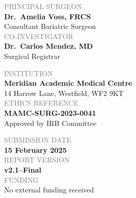\documentclass[11pt,a4paper]{article}
\begin{document}
\begin{minipage}[t]{0.32\textwidth}
  \begin{tcolorbox}[tealbox, title={}]
    \textcolor{GrayText}{\scriptsize\MakeUppercase{Principal Surgeon}}\\[2pt]
    {\small\bfseries\color{SurgBlue} Dr.\ Amelia Voss, FRCS}\\[1pt]
    {\scriptsize\color{GrayText} Consultant Bariatric Surgeon}\\[5pt]
    \textcolor{GrayText}{\scriptsize\MakeUppercase{Co-Investigator}}\\[2pt]
    {\small\bfseries\color{SurgBlue} Dr.\ Carlos Mendez, MD}\\[1pt]
    {\scriptsize\color{GrayText} Surgical Registrar}
  \end{tcolorbox}
\end{minipage}%
\hfill%
\begin{minipage}[t]{0.32\textwidth}
  \begin{tcolorbox}[tealbox, title={}]
    \textcolor{GrayText}{\scriptsize\MakeUppercase{Institution}}\\[2pt]
    {\small\bfseries\color{SurgBlue} Meridian Academic Medical Centre}\\[1pt]
    {\scriptsize\color{GrayText} 14 Harrow Lane, Westfield, WF2 9KT}\\[5pt]
    \textcolor{GrayText}{\scriptsize\MakeUppercase{Ethics Reference}}\\[2pt]
    {\small\bfseries\color{SurgBlue} MAMC-SURG-2023-0041}\\[1pt]
    {\scriptsize\color{GrayText} Approved by IRB Committee}
  \end{tcolorbox}
\end{minipage}%
\hfill%
\begin{minipage}[t]{0.30\textwidth}
  \begin{tcolorbox}[tealbox, title={}]
    \textcolor{GrayText}{\scriptsize\MakeUppercase{Submission Date}}\\[2pt]
    {\small\bfseries\color{SurgBlue} 15 February 2025}\\[5pt]
    \textcolor{GrayText}{\scriptsize\MakeUppercase{Report Version}}\\[2pt]
    {\small\bfseries\color{SurgBlue} v2.1\enspace--\enspace Final}\\[5pt]
    \textcolor{GrayText}{\scriptsize\MakeUppercase{Funding}}\\[2pt]
    {\scriptsize\color{GrayText} No external funding received}
  \end{tcolorbox}
\end{minipage}
\end{document}
